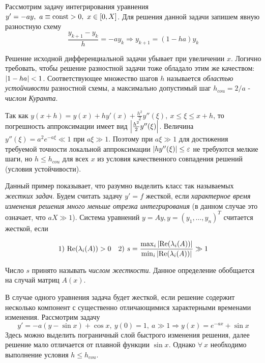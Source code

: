 Рассмотрим задачу интегрирования уравнения $y'=-ay,\ a\equiv\mathrm{const}>0,\ x\in[0,X]$.
Для решения данной задачи запишем явную разностную схему
\[\frac{y_{k+1}-y_k}{h}=-ay_{k}\Rightarrow y_{k+1}=(1-ha)y_k\]

Решение исходной дифференциальной задачи убывает при увеличении $x$.
Логично требовать, чтобы решение разностной задачи
тоже обладало этим же качеством: $\left\lvert1-ha\right\rvert<1$.
Соответствующее множество шагов $h$ называется \textit{областью устойчивости}
разностной схемы, а максимально допустимый шаг $h_{cou}=2/a$ - \textit{числом Куранта}.

Так как $y(x+h)=y(x)+hy'(x)+\frac{h^2}{2}y''(\xi),\ x\leq\xi\leq x+h$,
то погрешность аппроксимации имеет вид $\left\lvert\frac{h^2}{2}y''(\xi)\right\rvert$.
Величина $y''(\xi) = a^2e^{-a\xi} \ll 1$ при $a\xi\gg1$. Поэтому при
$a\xi\gg1$ для достижения требуемой точности локальной аппроксимации
$\left\lvert hy''(\xi)\right\rvert\leq\varepsilon$ не требуются мелкие шаги, но $h \leq h_{cou}$
для всех $x$ из условия качественного совпадения решений (условия устойчивости).

Данный пример показывает, что разумно выделить класс так называемых \textit{жестких
  задач}. Будем считать задачу $y'=f$ жесткой, если \textit{характерное время изменения
  решения много меньше отрезка интегрирования} (в данном случае это означает,
что $aX \gg 1$). Система уравнений $y = Ay, y = (y_1,\ldots,y_n)^T$ считается жесткой,
если

\[
  1)\ \text{Re}(\lambda_i(A))>0 \quad
  2)\ s=\frac{\max_i\abs{\text{Re}(\lambda_i(A))}}{\min_i\abs{\text{Re}(\lambda_i(A))}} \gg 1
\]

Число $s$ принято называть \textit{числом жесткости}. Данное определение обобщается на случай матриц $A(x)$.

В случае одного уравнения задача будет жесткой, если решение содержит
несколько компонент с существенно отличающимися характерными
временами изменения. Рассмотрим задачу
\[y' = -a(y-\sin x)+\cos x,\ y(0) = 1,\ a \gg 1\Rightarrow y(x) = e^{-ax} + \sin x\]
Здесь можно выделить пограничный слой быстрого изменения решения, далее решение
мало отличается от плавной функции $\sin x$. Однако $\forall\ x$ необходимо выполнение условия $h \leq h_{cou}$.

